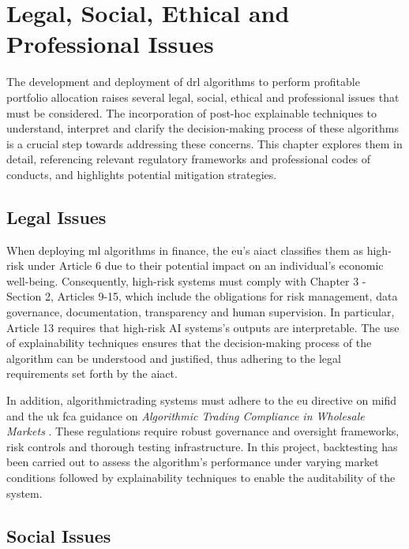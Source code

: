 \chapter{Legal, Social, Ethical and Professional Issues} \label{ch:issues}

The development and deployment of \acrfull{drl} algorithms to perform profitable portfolio allocation raises several legal, social, ethical and professional issues that must be considered. The incorporation of post-hoc explainable techniques to understand, interpret and clarify the decision-making process of these algorithms is a crucial step towards addressing these concerns. This chapter explores them in detail, referencing relevant regulatory frameworks and professional codes of conducts, and highlights potential mitigation strategies.

\section{Legal Issues} \label{sec:legal-issues}

When deploying \acrfull{ml} algorithms in finance, the \acrfull{eu}'s \acrfull{aiact} \cite{AIAct2024} classifies them as high-risk under Article 6 due to their potential impact on an individual's economic well-being. Consequently, high-risk systems must comply with Chapter 3 - Section 2, Articles 9-15, which include the obligations for risk management, data governance, documentation, transparency and human supervision. In particular, Article 13 requires that high-risk AI systems's outputs are interpretable. The use of explainability techniques ensures that the decision-making process of the algorithm can be understood and justified, thus adhering to the legal requirements set forth by the \acrshort{aiact}.

In addition, \gls{algorithmictrading} systems must adhere to the \acrlong{eu} directive on \acrfull{mifid} \cite{MiFIDII} and the \acrfull{uk} \acrfull{fca} guidance on \textit{Algorithmic Trading Compliance in Wholesale Markets} \cite{FCA2018}. These regulations require robust governance and oversight frameworks, risk controls and thorough testing infrastructure. In this project, \gls{backtesting} has been carried out to assess the algorithm's performance under varying market conditions followed by explainability techniques to enable the auditability of the system.

\section{Social Issues} \label{sec:social-issues}

